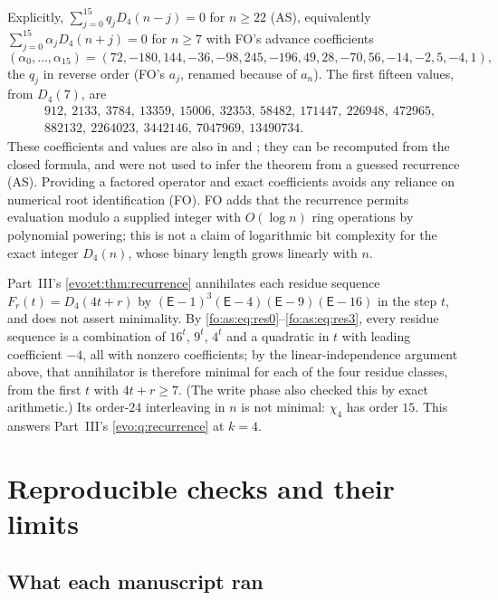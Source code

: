 \documentclass[11pt,a4paper]{article}
\numberwithin{equation}{section}
\theoremstyle{definition}
\theoremstyle{remark}
\begin{document}
Explicitly, $\sum_{j=0}^{15}q_jD_4(n-j)=0$ for $n\ge22$ (AS), equivalently
$\sum_{j=0}^{15}\alpha_jD_4(n+j)=0$ for $n\ge7$ with FO's advance coefficients
\[
(\alpha_0,\ldots,\alpha_{15})=(72,-180,144,-36,-98,245,-196,49,28,-70,56,-14,-2,5,-4,1),
\]
the $q_j$ in reverse order (FO's $a_j$, renamed because of $a_n$). The first
fifteen values, from $D_4(7)$, are
\[
\begin{aligned}
&912,\ 2133,\ 3784,\ 13359,\ 15006,\ 32353,\ 58482,\ 171447,\ 226948,\ 472965,\\
&882132,\ 2264023,\ 3442146,\ 7047969,\ 13490734.
\end{aligned}
\]
These coefficients and values are also in
 and
; they can be recomputed from the
closed formula, and were not used to infer the theorem from a guessed
recurrence (AS). Providing a factored operator and exact coefficients avoids
any reliance on numerical root identification (FO). FO adds that the
recurrence permits evaluation modulo a supplied integer with
$O(\log n)$ ring operations by polynomial powering; this is not a claim of
logarithmic bit complexity for the exact integer $D_4(n)$, whose binary length
grows linearly with $n$.

\begin{remark}\label{fo:rem:residueminimal}
Part~III's \cref{evo:et:thm:recurrence} annihilates each residue sequence
$F_r(t)=D_4(4t+r)$ by $(\mathsf E-1)^3(\mathsf E-4)(\mathsf E-9)(\mathsf E-16)$
in the step $t$, and does not assert minimality. By
\eqref{fo:as:eq:res0}--\eqref{fo:as:eq:res3}, every residue sequence is a
combination of $16^t$, $9^t$, $4^t$ and a quadratic in $t$ with leading
coefficient $-4$, all with nonzero coefficients; by the linear-independence
argument above, that annihilator is therefore minimal for each of the four
residue classes, from the first $t$ with $4t+r\ge7$. (The write phase also
checked this by exact arithmetic.) Its order-$24$ interleaving in $n$ is not
minimal: $\chi_4$ has order $15$. This answers Part~III's
\cref{evo:q:recurrence} at $k=4$.
\end{remark}

\section{Reproducible checks and their limits}\label{fo:sec:verification}

\subsection{What each manuscript ran}
\end{document}
